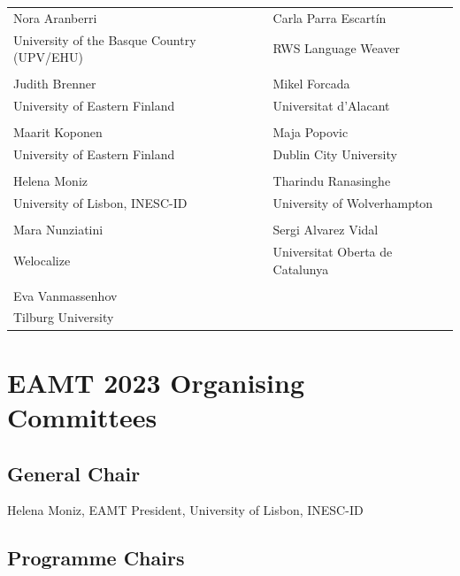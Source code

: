 \documentclass[a4paper,11pt,twoside]{book}
\begin{document}
\begin{onehalfspacing}
\vspace{1cm}
\begin{center}
\setlength{\tabcolsep}{20pt} 
\begin{tabular}{ll}
Nora Aranberri 		& Carla Parra Escartín\\
University of the Basque Country (UPV/EHU)	& RWS Language Weaver\\
\\
Judith Brenner			& Mikel Forcada\\
University of Eastern Finland	  & Universitat d’Alacant\\
\\ 
Maarit Koponen 		&  Maja Popovic\\
University of Eastern Finland	  & Dublin City University\\
\\
Helena Moniz			& Tharindu Ranasinghe\\ 
University of Lisbon, INESC-ID	  & University of Wolverhampton\\
\\ 
Mara Nunziatini 		& Sergi Alvarez Vidal\\
Welocalize    &  Universitat Oberta de Catalunya\\
\\
Eva Vanmassenhov\\
Tilburg University\\

\end{tabular}

\end{center}

\end{onehalfspacing}

\let\cleardoublepage\clearpage

\chapter*{EAMT 2023 Organising Committees}

\section*{General Chair}
\noindent Helena Moniz, EAMT President, University of Lisbon, INESC-ID

\section*{Programme Chairs}
\end{document}
